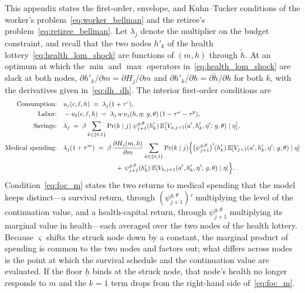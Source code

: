 \documentclass[12pt,a4paper]{article}
\newcommand{\E}{\mathbb{E}}
\begin{document}
\begin{appendices}
This appendix states the first-order, envelope, and Kuhn--Tucker conditions of the worker's problem~\eqref{eq:worker_bellman} and the retiree's problem~\eqref{eq:retiree_bellman}. Let $\lambda_j$ denote the multiplier on the budget constraint, and recall that the two nodes $h'_k$ of the health lottery~\eqref{eq:health_lom_shock} are functions of $(m, h)$ through $\tilde h$. At an optimum at which the $\min$ and $\max$ operators in~\eqref{eq:health_lom_shock} are slack at both nodes, $\partial h'_k / \partial m = \partial H_j / \partial m$ and $\partial h'_k / \partial h = \partial \tilde h / \partial h$ for both $k$, with the derivatives given in~\eqref{eq:dh_dh}. The interior first-order conditions are
\begin{align}
\text{Consumption:} \quad & u_c(c, \ell, h) \;=\; \lambda_j (1 + \tau^c), \label{eq:foc_c}\\
\text{Labor:} \quad & -u_\ell(c, \ell, h) \;=\; \lambda_j\, w\, \nu_j(h, \eta;\, g, \theta)\,(1-\tau^\omega-\tau^p), \label{eq:foc_l}\\
\text{Savings:} \quad & \lambda_j \;=\; \beta \sum_{k \in \{0,1\}} \Pr(k \mid j)\; \psi_{j+1}^{g,\theta}(h'_k)\, \E\bigl[V_{a, j+1}(a', h'_k, \eta';\, g, \theta) \mid \eta\bigr], \label{eq:foc_a}\\
\text{Medical spending:} \quad & \lambda_j (1 + \tau^m)
\;=\; \beta\, \frac{\partial H_j(m,h)}{\partial m} \sum_{k \in \{0,1\}} \Pr(k \mid j)\Bigl\{
\bigl(\psi_{j+1}^{g,\theta}\bigr)'(h'_k)\, \E[V_{j+1}(a', h'_k, \eta';\, g, \theta) \mid \eta] \notag\\
&\qquad\qquad\qquad\qquad +\, \psi_{j+1}^{g,\theta}(h'_k)\, \E[V_{h, j+1}(a', h'_k, \eta';\, g, \theta) \mid \eta]
\Bigr\}. \label{eq:foc_m}
\end{align}
Condition~\eqref{eq:foc_m} states the two returns to medical spending that the model keeps distinct---a survival return, through $(\psi^{g,\theta}_{j+1})'$ multiplying the level of the continuation value, and a health-capital return, through $\psi^{g,\theta}_{j+1}$ multiplying its marginal value in health---each averaged over the two nodes of the health lottery. Because $\varsigma$ shifts the struck node down by a constant, the marginal product of spending is common to the two nodes and factors out; what differs across nodes is the point at which the survival schedule and the continuation value are evaluated. If the floor $\underline h$ binds at the struck node, that node's health no longer responds to $m$ and the $k=1$ term drops from the right-hand side of~\eqref{eq:foc_m}.


\end{appendices}
\end{document}
